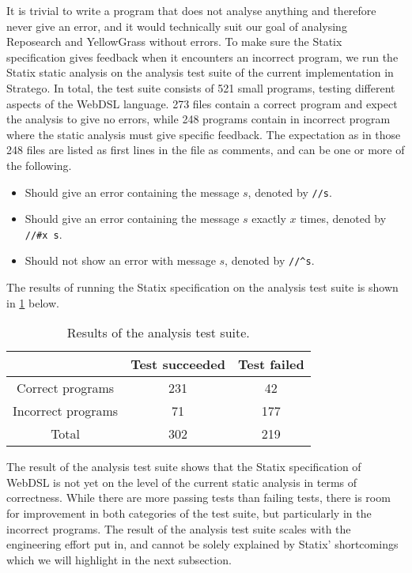     It is trivial to write a program that does not analyse anything and therefore never give an error, and it would technically suit our goal of analysing Reposearch and YellowGrass without errors. To make sure the Statix specification gives feedback when it encounters an incorrect program, we run the Statix static analysis on the analysis test suite of the current implementation in Stratego. In total, the test suite consists of 521 small programs, testing different aspects of the WebDSL language. 273 files contain a correct program and expect the analysis to give no errors, while 248 programs contain in incorrect program where the static analysis must give specific feedback. The expectation as in those 248 files are listed as first lines in the file as comments, and can be one or more of the following.

    \begin{itemize}
      \item Should give an error containing the message $s$, denoted by \texttt{//s}.
      \item Should give an error containing the message $s$ exactly $x$ times, denoted by \texttt{//\#x s}.
      \item Should not show an error with message $s$, denoted by \texttt{//\^{}s}.
    \end{itemize}

    The results of running the Statix specification on the analysis test suite is shown in \cref{tbl:statix-test-suite-results} below.

    \begin{table}[h]
      \centering
      \begin{tabular}{ | c || c | c | }
        \hline
        & Test succeeded & Test failed \\
        \hline
        Correct programs & 231 & 42 \\
        \hline
        Incorrect programs & 71 & 177 \\
        \hline\hline
        Total & 302 & 219 \\
        \hline
      \end{tabular}
      \caption{\label{tbl:statix-test-suite-results}Results of the analysis test suite.}
    \end{table}

    The result of the analysis test suite shows that the Statix specification of WebDSL is not yet on the level of the current static analysis in terms of correctness. While there are more passing tests than failing tests, there is room for improvement in both categories of the test suite, but particularly in the incorrect programs. The result of the analysis test suite scales with the engineering effort put in, and cannot be solely explained by Statix' shortcomings which we will highlight in the next subsection. 

